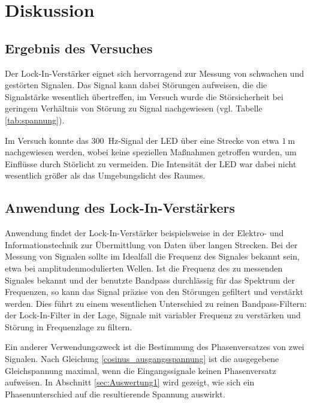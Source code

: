 \section{Diskussion}
\label{sec:Diskussion}

\subsection{Ergebnis des Versuches}
Der Lock-In-Verstärker eignet sich hervorragend zur Messung von schwachen und gestörten Signalen.
Das Signal kann dabei Störungen aufweisen, die die Signalstärke wesentlich übertreffen, im Versuch wurde die Störsicherheit bei geringem Verhältnis von Störung zu Signal nachgewiesen (vgl. Tabelle \ref{tab:spannung}).

Im Versuch konnte das \SI{300}{\hertz}-Signal der LED über eine Strecke von etwa $\SI{1}{\meter}$ nachgewiesen werden, wobei keine speziellen Maßnahmen getroffen wurden, um Einflüsse durch Störlicht zu vermeiden.
Die Intensität der LED war dabei nicht wesentlich größer als das Umgebungslicht des Raumes.

\subsection{Anwendung des Lock-In-Verstärkers}
Anwendung findet der Lock-In-Verstärker beispielsweise in der Elektro- und Informationstechnik zur Übermittlung von Daten über langen Strecken.
Bei der Messung von Signalen sollte im Idealfall die Frequenz des Signales bekannt sein, etwa bei amplitudenmodulierten Wellen.
Ist die Frequenz des zu messenden Signales bekannt und der benutzte Bandpass durchlässig für das Spektrum der Frequenzen, so kann das Signal präzise von den Störungen gefiltert und verstärkt werden.
Dies führt zu einem wesentlichen Unterschied zu reinen Bandpass-Filtern:
der Lock-In-Filter in der Lage, Signale mit variabler Frequenz zu verstärken und Störung in Frequenzlage zu filtern. 

Ein anderer Verwendungszweck ist die Bestimmung des Phasenversatzes von zwei Signalen. 
Nach Gleichung \eqref{cosinus_ausgangsspannung} ist die ausgegebene Gleichspannung maximal, wenn die Eingangssignale keinen Phasenversatz aufweisen. 
In Abschnitt \ref{sec:Auswertung1} wird gezeigt, wie sich ein Phasenunterschied auf die resultierende Spannung auswirkt. 